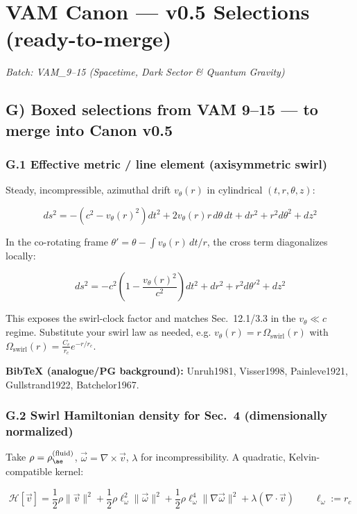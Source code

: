 \documentclass[11pt]{article}
\begin{document}
\chapter*{VAM Canon — v0.5 Selections (ready-to-merge)}

\textit{Batch: VAM\_9--15 (Spacetime, Dark Sector \& Quantum Gravity)}

\section*{G) Boxed selections from VAM 9--15 --- to merge into Canon v0.5}

\subsection*{G.1 Effective metric / line element (axisymmetric swirl)}

Steady, incompressible, azimuthal drift $v_\theta(r)$ in cylindrical $(t,r,\theta,z)$:

\[
\boxed{
ds^2 = -\left(c^2 - v_\theta(r)^2\right) dt^2 + 2 v_\theta(r) r\, d\theta\, dt + dr^2 + r^2 d\theta^2 + dz^2
}
\]

In the co-rotating frame $\theta' = \theta - \int v_\theta(r)\,dt / r$, the cross term diagonalizes locally:

\[
\boxed{
ds^2 = -c^2\left(1 - \frac{v_\theta(r)^2}{c^2}\right) dt^2 + dr^2 + r^2 d\theta'^2 + dz^2
}
\]

This exposes the swirl-clock factor and matches Sec.~12.1/3.3 in the $v_\theta \ll c$ regime. Substitute your swirl law as needed, e.g. $v_\theta(r) = r\,\Omega_{\text{swirl}}(r)$ with $\Omega_{\text{swirl}}(r) = \frac{C_e}{r_c} e^{-r/r_c}$.

\textbf{BibTeX (analogue/PG background):} Unruh1981, Visser1998, Painleve1921, Gullstrand1922, Batchelor1967.

\subsection*{G.2 Swirl Hamiltonian density for Sec.~4 (dimensionally normalized)}

Take $\rho = \rho_{\ae}^{(\text{fluid})}$, $\vec{\omega} = \nabla \times \vec{v}$, $\lambda$ for incompressibility. A quadratic, Kelvin-compatible kernel:

\[
\boxed{
\mathcal{H}[\vec{v}] = \frac{1}{2} \rho \lVert \vec{v} \rVert^2 + \frac{1}{2} \rho \ell_\omega^2 \lVert \vec{\omega} \rVert^2 + \frac{1}{2} \rho \ell_\omega^4 \lVert \nabla \vec{\omega} \rVert^2 + \lambda (\nabla \cdot \vec{v})
}
\qquad \ell_\omega := r_c
\]
\end{document}
